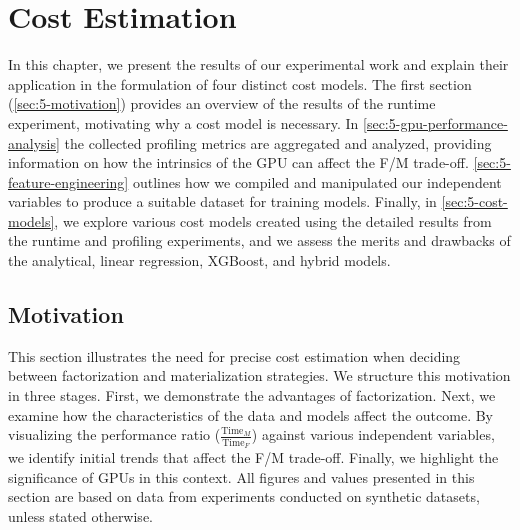 
\chapter{Cost Estimation}

\label{chapter:cost-estimation}
In this chapter, we present the results of our experimental work and explain their application in the formulation of four distinct cost models. The first section (\autoref{sec:5-motivation}) provides an overview of the results of the runtime experiment, motivating why a cost model is necessary. In \autoref{sec:5-gpu-performance-analysis} the collected profiling metrics are aggregated and analyzed, providing information on how the intrinsics of the GPU can affect the F/M trade-off. \autoref{sec:5-feature-engineering} outlines how we compiled and manipulated our independent variables to produce a suitable dataset for training models. Finally, in \autoref{sec:5-cost-models}, we explore various cost models created using the detailed results from the runtime and profiling experiments, and we assess the merits and drawbacks of the analytical, linear regression, XGBoost, and hybrid models.

\section{Motivation}
\label{sec:5-motivation}

This section illustrates the need for precise cost estimation when deciding between factorization and materialization strategies. We structure this motivation in three stages. First, we demonstrate the advantages of factorization. Next, we examine how the characteristics of the data and models affect the outcome. By visualizing the performance ratio ($\frac{\text{Time}_M}{\text{Time}_F}$) against various independent variables, we identify initial trends that affect the F/M trade-off. Finally, we highlight the significance of GPUs in this context. All figures and values presented in this section are based on data from experiments conducted on synthetic datasets, unless stated otherwise.

